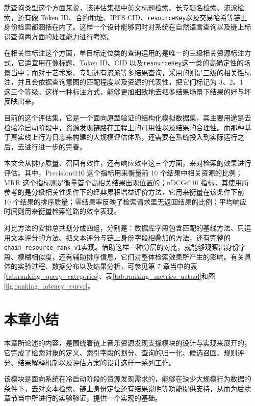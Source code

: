 就查询类型这个方面来说，该评估集把中英文标题检索、长专辑名检索、流派检索，还有像 Token ID、合约地址、IPFS CID、\texttt{resourceKey}以及交易哈希等链上身份检索都涵括在内了。这样一个设计能够同时对系统在自然语言查询以及链上标识查询两方面的处理能力进行考察。

在相关性标注这个方面，单目标定位类的查询运用的是唯一的三级相关资源标注方式，它适宜用在像标题、Token ID、CID 以及\texttt{resourceKey}这一类的高确定性的场景当中；而对于艺术家、专辑还有流派等多结果查询，采用的则是三级的相关性标注，并且会依据查询意图的匹配程度以及资源的代表性，把它们标记为 3、2、1 这三个等级。这样一种标注方式，能够更加细致地去把多结果场景下结果的好与坏反映出来。

目前的这个评估集，它是一个面向原型验证的结构化模拟数据集，其主要用途是去检验冷启动阶段中，资源发现链路在工程上的可用性以及结果的合理性。而那种基于真实线上行为日志来构建的大规模评估体系，还需要在系统投入到实际运行之后，去进行进一步的完善。

本文会从排序质量、召回有效性，还有响应效率这三个方面，来对检索的效果进行评估。其中，Precision@10 这个指标用来衡量前 10 个结果中相关资源的比例；MRR 这个指标则是衡量首个高相关结果出现位置的；nDCG@10 指标，其使用所参考的是分级相关性条件下的经典累积增益评价方法\cite{Jarvelin2002CG}，它用来衡量在该条件下前 10 个结果的排序质量；零结果率反映了检索请求里无返回结果的比例；平均响应时间则用来衡量检索链路的效率表现。

对比方法的安排总共划分成四组，分别是：数据库字段包含匹配的基线方法、只运用文本评分的方法、把文本评分与链上身份字段相叠加的方法，还有完整的\texttt{chain\_resource\_rank\_v1}实现。借助这样一种分层的对比，就能够观察出身份字段、模糊相似度，还有辅助排序信息，它们对整体检索效果所产生的影响。有关具体的实验过程、数据分布以及结果分析，可参见第 7 章当中的表\ref{tab:ranking_query_categories}、表\ref{tab:ranking_metrics_actual}和图\ref{fig:ranking_latency_curve}。


\section{本章小结}

本章所论述的内容，是围绕着链上音乐资源发现支撑模块的设计与实现来展开的，它完成了检索对象的定义、索引字段的划分、查询的归一化、候选召回、规则评分、结果解释机制以及评估方案的设计这样一系列工作。

该模块是面向系统在冷启动阶段的资源发现需求的，能够在缺少大规模行为数据的条件下，去对文本检索、链上身份定位还有结果说明等功能提供支持，从而为后续章节当中所进行的实验验证，提供一个实现的基础。
